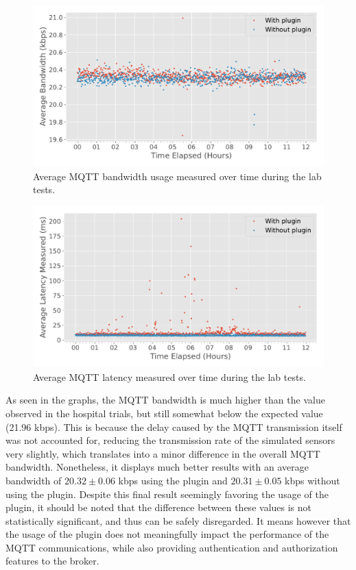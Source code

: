 \begin{figure}[H]
    \centering
    \includegraphics[width=0.85\linewidth]{images/labtest_mqtt_bandwidth.pdf}
    \caption{Average \acs{MQTT} bandwidth usage measured over time during the lab tests.}
    \label{fig:labtest-mqtt-bandwidth}
\end{figure}

\begin{figure}[H]
    \centering
    \includegraphics[width=0.85\linewidth]{images/labtest_mqtt_latency.pdf}
    \caption{Average \acs{MQTT} latency measured over time during the lab tests.}
    \label{fig:labtest-mqtt-latency}
\end{figure}

As seen in the graphs, the \acs{MQTT} bandwidth is much higher than the value observed in the hospital trials, but still somewhat below the expected value (21.96 kbps). 
This is because the delay caused by the \acs{MQTT} transmission itself was not accounted for, reducing the transmission rate of the simulated sensors very slightly, which translates into a minor difference in the overall \acs{MQTT} bandwidth. Nonetheless, it displays much better results with an average bandwidth of $20.32 \pm 0.06$ kbps using the plugin and $20.31 \pm 0.05$ kbps without using the plugin. Despite this final result seemingly favoring the usage of the plugin, it should be noted that the difference between these values is not statistically significant, and thus can be safely disregarded. It means however that the usage of the plugin does not meaningfully impact the performance of the \acs{MQTT} communications, while also providing authentication and authorization features to the broker.

